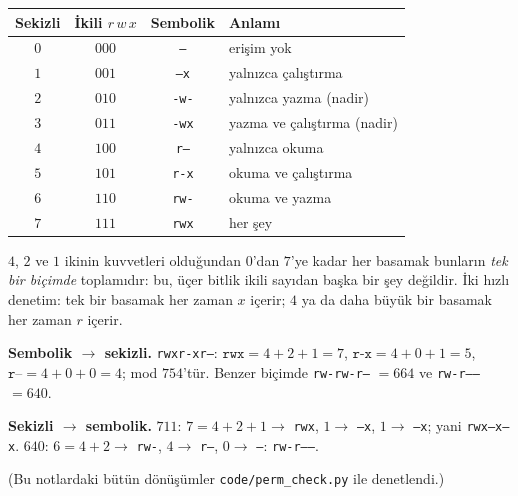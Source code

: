 \documentclass[11pt,a4paper]{article}
\newcommand{\cmd}[1]{\texttt{#1}}
\begin{document}
\begin{center}
\small
\begin{tabular}{@{}c c c l@{}}
\toprule
\textbf{Sekizli} & \textbf{İkili} $r\,w\,x$ & \textbf{Sembolik} & \textbf{Anlamı} \\
\midrule
$0$ & $000$ & \texttt{---} & erişim yok \\
$1$ & $001$ & \texttt{--x} & yalnızca çalıştırma \\
$2$ & $010$ & \texttt{-w-} & yalnızca yazma (nadir) \\
$3$ & $011$ & \texttt{-wx} & yazma ve çalıştırma (nadir) \\
$4$ & $100$ & \texttt{r--} & yalnızca okuma \\
$5$ & $101$ & \texttt{r-x} & okuma ve çalıştırma \\
$6$ & $110$ & \texttt{rw-} & okuma ve yazma \\
$7$ & $111$ & \texttt{rwx} & her şey \\
\bottomrule
\end{tabular}
\end{center}

$4$, $2$ ve $1$ ikinin kuvvetleri olduğundan $0$'dan $7$'ye kadar her basamak bunların \emph{tek bir biçimde} toplamıdır: bu, üçer bitlik ikili sayıdan başka bir şey değildir. İki hızlı denetim: tek bir basamak her zaman $x$ içerir; $4$ ya da daha büyük bir basamak her zaman $r$ içerir.

\begin{example}
\textbf{Sembolik $\to$ sekizli.} \texttt{rwxr-xr--}: $\texttt{rwx} = 4+2+1 = 7$, $\texttt{r-x} = 4+0+1 = 5$, $\texttt{r--} = 4+0+0 = 4$; mod $754$'tür. Benzer biçimde \texttt{rw-rw-r--} $= 664$ ve \texttt{rw-r-----} $= 640$.

\textbf{Sekizli $\to$ sembolik.} $711$: $7 = 4+2+1 \to$ \texttt{rwx}, $1 \to$ \texttt{--x}, $1 \to$ \texttt{--x}; yani \texttt{rwx--x--x}. $640$: $6 = 4+2 \to$ \texttt{rw-}, $4 \to$ \texttt{r--}, $0 \to$ \texttt{---}: \texttt{rw-r-----}.

(Bu notlardaki bütün dönüşümler \cmd{code/perm\_check.py} ile denetlendi.)
\end{example}
\end{document}
